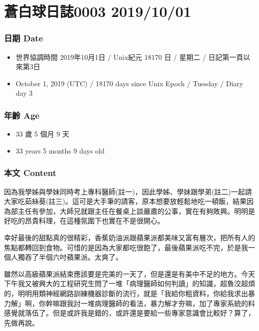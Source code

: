 \documentclass[
]{article}
\date{}
\providecommand{\tightlist}{%
  \setlength{\itemsep}{0pt}\setlength{\parskip}{0pt}}
\begin{document}
\hypertarget{ux84bcux767dux7403ux65e5ux8a8c0003-20191001}{%
\section{蒼白球日誌0003
2019/10/01}\label{ux84bcux767dux7403ux65e5ux8a8c0003-20191001}}

\hypertarget{ux65e5ux671f-date}{%
\subsubsection{日期 Date}\label{ux65e5ux671f-date}}

\begin{itemize}
\tightlist
\item
  世界協調時間 2019年10月1日 / Unix紀元 18170 日 / 星期二 /
  日記第一頁以來第3日
\item
  October 1, 2019 (UTC) / 18170 days since Unix Epoch / Tuesday / Diary
  day 3
\end{itemize}

\hypertarget{ux5e74ux9f61-age}{%
\subsubsection{年齡 Age}\label{ux5e74ux9f61-age}}

\begin{itemize}
\tightlist
\item
  33 歲 5 個月 9 天
\item
  33 years 5 months 9 days old
\end{itemize}

\hypertarget{ux672cux6587-content}{%
\subsubsection{本文 Content}\label{ux672cux6587-content}}

因為我學姊與學妹同時考上專科醫師(註一)，因此學姊、學妹跟學弟(註二)一起請大家吃茹絲葵(註三)。這可是大手筆的請客，原本想要放輕鬆地吃一頓飯，結果因為部主任有參加，大師兄就跟主任在餐桌上談嚴肅的公事，實在有夠敗興。明明是好吃的昂貴料理，在這種氛圍下也實在不是很開心。

幸好最後的甜點真的很精彩，香蕉奶油派跟蘋果派都美味又富有層次，把所有人的焦點都轉回到食物。可惜的是因為大家都吃很飽了，最後蘋果派吃不完，於是我一個人獨吞了半個六吋蘋果派。太爽了。

雖然以高級蘋果派結束應該要是完美的一天了，但是還是有美中不足的地方。今天下午我又被興大的工程研究生問了一堆「病理醫師如何判讀」的知識，超魯洨超煩的，明明用類神經網路訓練機器診斷的流行，就是「我給你粗資料，你給我求出暴力解」啊，你幹嘛跟我討一堆病理醫師的看法，暴力解才夯嘛，加了專家系統的料感覺就落伍了。但是或許我是錯的，或許還是要給一些專家意識會比較好？算了，先做再說。
\end{document}

